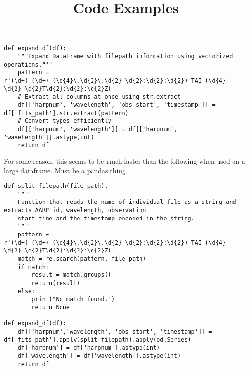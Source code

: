 \documentclass{../template/texnote}
\title{Code Examples}
\begin{document}
    \maketitle {}
\begin{verbatim}
def expand_df(df):
    """Expand DataFrame with filepath information using vectorized operations."""
    pattern = r'(\d+)_(\d+)_(\d{4}\.\d{2}\.\d{2}_\d{2}:\d{2}:\d{2})_TAI_(\d{4}-\d{2}-\d{2}T\d{2}:\d{2}:\d{2}Z)'
    # Extract all columns at once using str.extract
    df[['harpnum', 'wavelength', 'obs_start', 'timestamp']] = df['fits_path'].str.extract(pattern)
    # Convert types efficiently
    df[['harpnum', 'wavelength']] = df[['harpnum', 'wavelength']].astype(int)
    return df
\end{verbatim}
For some reason, this seems to be much faster than the following when used on a large dataframe.
Must be a pandas thing.

\begin{verbatim}
def split_filepath(file_path):
    """ 
    Function that reads the name of individual file as a string and extracts AARP id, wavelength, observation
    start time and the timestamp encoded in the string.
    """
    pattern = r'(\d+)_(\d+)_(\d{4}\.\d{2}\.\d{2}_\d{2}:\d{2}:\d{2})_TAI_(\d{4}-\d{2}-\d{2}T\d{2}:\d{2}:\d{2}Z)'
    match = re.search(pattern, file_path)
    if match:
        result = match.groups()
        return(result)
    else:
        print("No match found.")
        return None

def expand_df(df):
    df[['harpnum','wavelength', 'obs_start', 'timestamp']] = df['fits_path'].apply(split_filepath).apply(pd.Series)
    df['harpnum'] = df['harpnum'].astype(int)
    df['wavelength'] = df['wavelength'].astype(int)
    return df
\end{verbatim}
    \printbibliography
\end{document}
